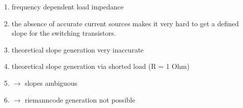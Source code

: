 \begin{enumerate}
	\item frequency dependent load impedance
	\item the absence of accurate current sources makes it very hard to get a defined slope for the switching transistors.
	\item theoretical slope generation very inaccurate
	\item theoretical slope generation via shorted load  (R = 1 Ohm)
	\item $\rightarrow$ slopes ambiguous
	
	\item $\rightarrow$ riemanncode generation not possible                                                                                                                                                                                                                                                                                                                                                                                                                                                                                                                                                                                                                                                                                                                                                                                                                                                                                                                                                                                                                                                                                                                                                                                                                                                                                                                                                                                                                                                          
\end{enumerate}